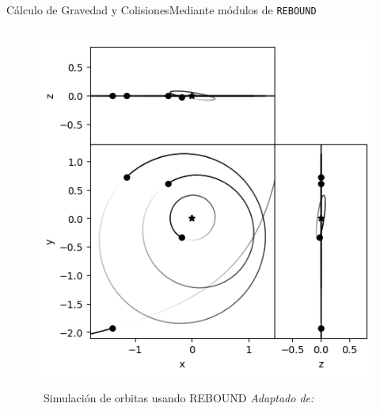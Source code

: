 \begin{frame}{Cálculo de Gravedad y Colisiones}{Mediante módulos de \texttt{REBOUND}}
\begin{columns}
\begin{column}{0.4\textwidth}
\begin{figure}[H]
{                \includegraphics{img/marcoTeorico/rebound-simulation.png}
                }
                \vspace{-0.25cm}
                \caption{\tiny~Simulación de orbitas usando REBOUND \textit{Adaptado de:}~\cite{rebound_hyperbolic_orbits_2025}}%
                \label{fig:REBOUND_methods}
            \end{figure}
        \end{column}
    \end{columns}
\end{frame}

